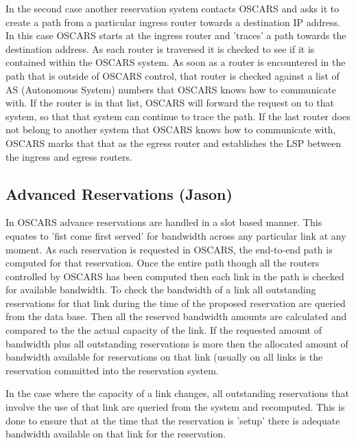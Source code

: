 \documentclass[conference]{IEEEtran}
\begin{document}
In the second case another reservation system contacts OSCARS and asks it to
create a path from a particular ingress router towards a destination IP address.
In this case OSCARS starts at the ingress router and 'traces' a path towards the
destination address. As each router is traversed it is checked to see if it is
contained within the OSCARS system. As soon as a router is encountered in the
path that is outside of OSCARS control, that router is checked against a list of
AS (Autonomous System) numbers that OSCARS knows how to communicate with. If the
router is in that list, OSCARS will forward the request on to that system, so
that that system can continue to trace the path. If the last router does not
belong to another system that OSCARS knows how to communicate with, OSCARS marks
that that as the egress router and establishes the LSP between the ingress and
egress routers.

\subsection{Advanced Reservations (Jason)}
In OSCARS advance reservations are handled in a slot based manner. This equates
to 'fist come first served' for bandwidth across any particular link at any
moment. As each reservation is requested in OSCARS, the end-to-end path is
computed for that reservation. Once the entire path though all the routers
controlled by OSCARS has been computed then each link in the path is checked for
available bandwidth. To check the bandwidth of a link all outstanding
reservations for that link during the time of the proposed reservation are
queried from the data base. Then all the reserved bandwidth amounts are
calculated and compared to the the actual capacity of the link. If the requested
amount of bandwidth plus all outstanding reservations is more then the allocated
amount of bandwidth available for reservations on that link (usually
on all links is the reservation committed into the reservation system.

In the case where the capacity of a link changes, all outstanding reservations
that involve the use of that link are queried from the system and recomputed.
This is done to ensure that at the time that the reservation is 'setup' there
is adequate bandwidth available on that link for the reservation.
\end{document}
